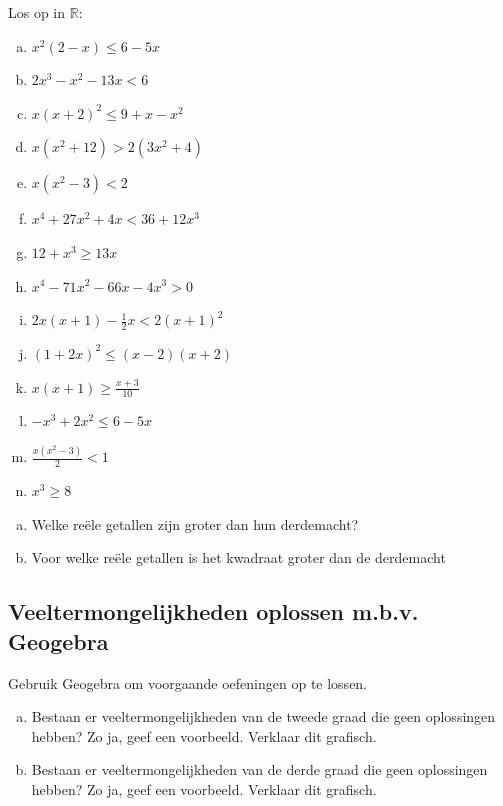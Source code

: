\documentclass[12pt,twoside,a4paper]{article}
\begin{document}
\begin{oefening}
  Los op in $\mathbb{R}$:
  \begin{multicols}{2}
    \begin{enumerate}[(a)]
      \itemsep0.8em
    \item $x^2(2-x)\leq6-5x$
    \item $2x^3-x^2-13x<6$
    \item $x(x+2)^2\leq9+x-x^2$
    \item $x(x^2+12)>2(3x^2+4)$
    \item $x(x^2-3)<2$
    \item $x^4+27x^2+4x<36+12x^3$
    \item $12+x^3\geq13x$
    \item $x^4-71x^2-66x-4x^3>0$
    \item $2x(x+1)-\frac{1}{2}x<2(x+1)^2$
    \item $(1+2x)^2\leq(x-2)(x+2)$
    \item $x(x+1)\geq\frac{x+3}{10}$
    \item $-x^3+2x^2\leq6-5x$
    \item $\frac{x(x^2-3)}{2}<1$
    \item $x^3\geq8$
    \end{enumerate}
  \end{multicols}
\end{oefening}

\begin{oefening}
  \begin{enumerate}[(a)]
    \itemsep.8em
  \item Welke reële getallen zijn groter dan hun derdemacht?
  \item Voor welke reële getallen is het kwadraat groter dan de derdemacht
  \end{enumerate}
\end{oefening}

\subsection{Veeltermongelijkheden oplossen m.b.v. Geogebra}


\begin{oefening}
Gebruik Geogebra om voorgaande oefeningen op te lossen.
\end{oefening}

\begin{oefening}
  \begin{enumerate}[(a)]
  \item Bestaan er veeltermongelijkheden van de tweede graad die geen
    oplossingen hebben? Zo ja, geef een voorbeeld. Verklaar dit
    grafisch.
  \item Bestaan er veeltermongelijkheden van de derde graad die geen
    oplossingen hebben? Zo ja, geef een voorbeeld. Verklaar dit
    grafisch.
  \end{enumerate}
\end{oefening}
\end{document}
